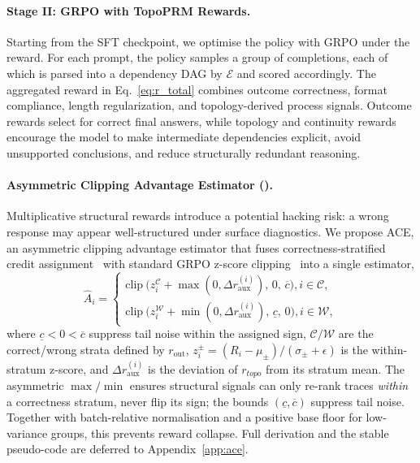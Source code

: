 \paragraph{Stage II: GRPO with TopoPRM Rewards.}
Starting from the SFT checkpoint, we optimise the policy with GRPO under the \method reward. For each prompt, the policy samples a group of completions, each of which is parsed into a dependency DAG by $\mathcal{E}$ and scored accordingly. The aggregated reward in Eq.~\ref{eq:r_total} combines outcome correctness, format compliance, length regularization, and topology-derived process signals. Outcome rewards select for correct final answers, while topology and continuity rewards encourage the model to make intermediate dependencies explicit, avoid unsupported conclusions, and reduce structurally redundant reasoning.

\paragraph{Asymmetric Clipping Advantage Estimator (\estimation).}
Multiplicative structural rewards introduce a potential hacking risk: a wrong response may appear well-structured under surface diagnostics. We propose ACE, an asymmetric clipping advantage estimator that fuses correctness-stratified credit assignment~\citep{liu2026graph} with standard GRPO z-score clipping~\citep{shao2024deepseekmath} into a single estimator,
\begin{equation}    
\label{eq:ace}
\widehat{A}_i =
\begin{cases}
\mathrm{clip}~\!\bigl(z_i^{\mathcal{C}} + \max(0,\Delta r_{\mathrm{aux}}^{(i)}),\, 0,\, \overline{c}\bigr), i\in\mathcal{C},\\[2pt]
\mathrm{clip}~\!\bigl(z_i^{\mathcal{W}} + \min(0,\Delta r_{\mathrm{aux}}^{(i)}),\, \underline{c},\, 0\bigr), i\in\mathcal{W},
\end{cases}
\end{equation}
where $\underline{c}<0<\overline{c}$ suppress tail noise within the assigned sign, $\mathcal{C}/\mathcal{W}$ are the correct/wrong strata defined by $r_{\text{out}}$, $z_i^{\pm}\!=\!(R_i-\mu_\pm)/(\sigma_\pm+\epsilon)$ is the within-stratum z-score, and $\Delta r_{\mathrm{aux}}^{(i)}$ is the deviation of $r_{topo}$ from its stratum mean. The asymmetric $\max/\min$ ensures structural signals can only re-rank traces \emph{within} a correctness stratum, never flip its sign; the bounds $(\underline{c},\overline{c})$ suppress tail noise. Together with batch-relative normalisation and a positive base floor for low-variance groups, this prevents reward collapse. Full derivation and the stable pseudo-code are deferred to Appendix~\ref{app:ace}.

